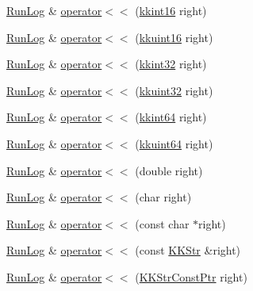 \begin{DoxyCompactItemize}
\hyperlink{class_k_k_b_1_1_run_log}{Run\+Log} \& \hyperlink{class_k_k_b_1_1_run_log_a5e2a637d352a4abc0d09745e2f3f48f4}{operator$<$$<$} (\hyperlink{namespace_k_k_b_a93809780ee294124dda4c23069f41248}{kkint16} right)
\item 
\hyperlink{class_k_k_b_1_1_run_log}{Run\+Log} \& \hyperlink{class_k_k_b_1_1_run_log_ae0ae3cd78f44d4b19b846a1046be46de}{operator$<$$<$} (\hyperlink{namespace_k_k_b_aa8c7d4d30381c8a0b6fce68974a9c8a9}{kkuint16} right)
\item 
\hyperlink{class_k_k_b_1_1_run_log}{Run\+Log} \& \hyperlink{class_k_k_b_1_1_run_log_a64acb9b257be96ca12fe44e5acc145c4}{operator$<$$<$} (\hyperlink{namespace_k_k_b_a8fa4952cc84fda1de4bec1fbdd8d5b1b}{kkint32} right)
\item 
\hyperlink{class_k_k_b_1_1_run_log}{Run\+Log} \& \hyperlink{class_k_k_b_1_1_run_log_aa528abd5d75b42aa50b705eb524fed87}{operator$<$$<$} (\hyperlink{namespace_k_k_b_af8d832f05c54994a1cce25bd5743e19a}{kkuint32} right)
\item 
\hyperlink{class_k_k_b_1_1_run_log}{Run\+Log} \& \hyperlink{class_k_k_b_1_1_run_log_aa641646072479768b1c018c17cc22c18}{operator$<$$<$} (\hyperlink{namespace_k_k_b_aa3486b1c5ea9162b3b020c69f72826eb}{kkint64} right)
\item 
\hyperlink{class_k_k_b_1_1_run_log}{Run\+Log} \& \hyperlink{class_k_k_b_1_1_run_log_a9c9526d49d283932daedae326e870959}{operator$<$$<$} (\hyperlink{namespace_k_k_b_a1f2b0568d3b63cc7697dcff73250113e}{kkuint64} right)
\item 
\hyperlink{class_k_k_b_1_1_run_log}{Run\+Log} \& \hyperlink{class_k_k_b_1_1_run_log_a5b07297e9f5f923f2734d238baabad86}{operator$<$$<$} (double right)
\item 
\hyperlink{class_k_k_b_1_1_run_log}{Run\+Log} \& \hyperlink{class_k_k_b_1_1_run_log_a64b5552783b64cfa572fca2725f068f9}{operator$<$$<$} (char right)
\item 
\hyperlink{class_k_k_b_1_1_run_log}{Run\+Log} \& \hyperlink{class_k_k_b_1_1_run_log_abe705f93f340fb43d73a4cbf8635fa0e}{operator$<$$<$} (const char $\ast$right)
\item 
\hyperlink{class_k_k_b_1_1_run_log}{Run\+Log} \& \hyperlink{class_k_k_b_1_1_run_log_ae3ed201888b88fcc61357f57ec2c94c6}{operator$<$$<$} (const \hyperlink{class_k_k_b_1_1_k_k_str}{K\+K\+Str} \&right)
\item 
\hyperlink{class_k_k_b_1_1_run_log}{Run\+Log} \& \hyperlink{class_k_k_b_1_1_run_log_abd0f2dd4fd518d3f577fea5eb0f14feb}{operator$<$$<$} (\hyperlink{namespace_k_k_b_a46f665ec17615c856eff3d21f78bed5c}{K\+K\+Str\+Const\+Ptr} right)

\end{DoxyCompactItemize}
